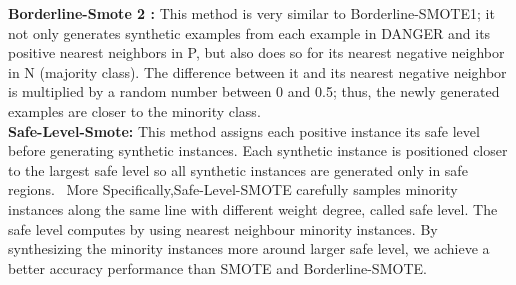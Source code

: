 \textbf{ Borderline-Smote 2 :}
 This method is very similar to Borderline-SMOTE1; it not only generates synthetic examples from each example in DANGER and its positive nearest neighbors in P, but also does so for its nearest negative neighbor in N (majority class). The difference between it and its nearest negative neighbor is multiplied by a random number between 0 and 0.5; thus, the newly generated examples are closer to the minority class.\noindent \\

\textbf{Safe-Level-Smote:} This method assigns each positive instance its safe level before generating synthetic instances. Each synthetic instance is positioned closer to the largest safe level so all synthetic instances are generated only in safe regions.~\cite{Meidianingsih2017TheSO}
More Specifically,Safe-Level-SMOTE carefully samples minority instances along the same line with different weight degree, called safe level. The safe level computes by using nearest neighbour minority instances. By synthesizing the minority instances more around larger safe level, we achieve a better accuracy performance than SMOTE and Borderline-SMOTE.\noindent \\


